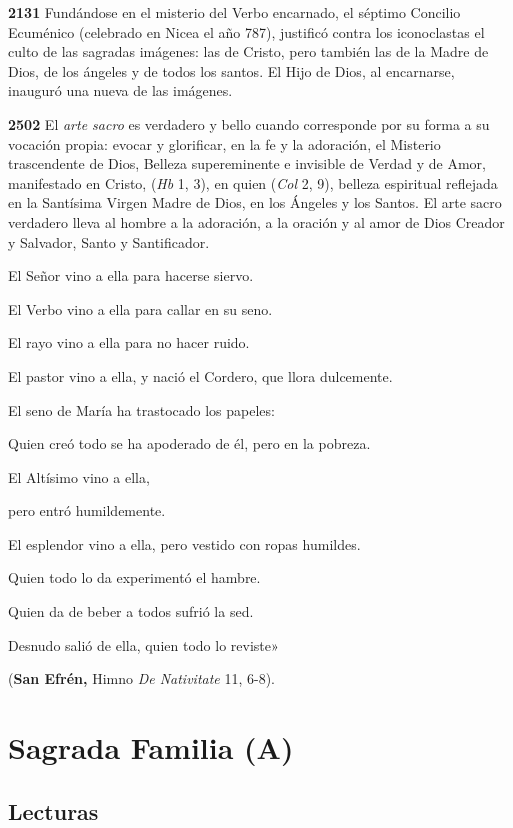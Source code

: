 \textbf{2131} Fundándose en el misterio del Verbo encarnado, el séptimo Concilio Ecuménico (celebrado en Nicea el año 787), justificó contra los iconoclastas el culto de las sagradas imágenes: las de Cristo, pero también las de la Madre de Dios, de los ángeles y de todos los santos. El Hijo de Dios, al encarnarse, inauguró una nueva  de las imágenes.

\textbf{2502} El \emph{arte sacro} es verdadero y bello cuando corresponde por su forma a su vocación propia: evocar y glorificar, en la fe y la adoración, el Misterio trascendente de Dios, Belleza supereminente e invisible de Verdad y de Amor, manifestado en Cristo,  (\emph{Hb} 1, 3), en quien  (\emph{Col} 2, 9), belleza espiritual reflejada en la Santísima Virgen Madre de Dios, en los Ángeles y los Santos. El arte sacro verdadero lleva al hombre a la adoración, a la oración y al amor de Dios Creador y Salvador, Santo y Santificador.

El Señor vino a ella para hacerse siervo.

El Verbo vino a ella para callar en su seno.

El rayo vino a ella para no hacer ruido.

El pastor vino a ella, y nació el Cordero, que llora dulcemente.

El seno de María ha trastocado los papeles:

Quien creó todo se ha apoderado de él, pero en la pobreza.

El Altísimo vino a ella,

pero entró humildemente.

El esplendor vino a ella, pero vestido con ropas humildes.

Quien todo lo da experimentó el hambre.

Quien da de beber a todos sufrió la sed.

Desnudo salió de ella, quien todo lo reviste»

(\textbf{San Efrén,} Himno \emph{De Nativitate} 11, 6-8).

\chapter{Sagrada Familia (A)}

\section{Lecturas}

